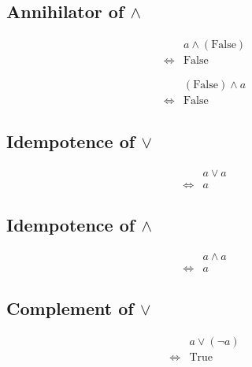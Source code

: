 \subsection{Annihilator of $\land$}
\begin{prop}
\label{Proposition:land_annihilator_1}
\begin{align*}
& a \land (\text{False}) \\
\iff & \text{False}
\end{align*}
\end{prop}

\begin{prop}
\label{Proposition:land_annihilator_2}
\begin{align*}
& (\text{False}) \land a \\
\iff & \text{False}
\end{align*}
\end{prop}

\subsection{Idempotence of $\lor$}
\begin{prop}
\label{Proposition:lor_idempotence}
\begin{align*}
& a \lor a \\
\iff & a
\end{align*}
\end{prop}

\subsection{Idempotence of $\land$}
\begin{prop}
\label{Proposition:land_idempotence}
\begin{align*}
& a \land a \\
\iff & a
\end{align*}
\end{prop}

\subsection{Complement of $\lor$}
\begin{prop}
\label{Proposition:lor_complement_1}
\begin{align*}
& a \lor (\lnot a) \\
\iff & \text{True}
\end{align*}
\end{prop}

